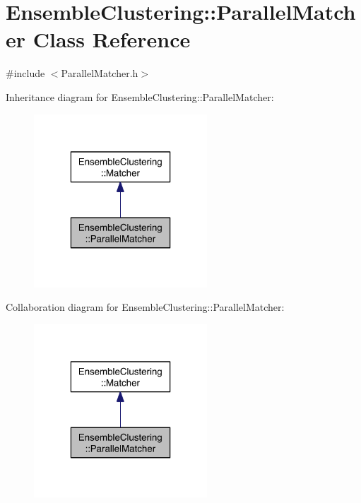 \hypertarget{class_ensemble_clustering_1_1_parallel_matcher}{\section{Ensemble\-Clustering\-:\-:Parallel\-Matcher Class Reference}
\label{class_ensemble_clustering_1_1_parallel_matcher}
}


{\ttfamily \#include $<$Parallel\-Matcher.\-h$>$}



Inheritance diagram for Ensemble\-Clustering\-:\-:Parallel\-Matcher\-:\nopagebreak
\begin{figure}[H]
\begin{center}
\leavevmode
\includegraphics[width=184pt]{class_ensemble_clustering_1_1_parallel_matcher__inherit__graph}
\end{center}
\end{figure}


Collaboration diagram for Ensemble\-Clustering\-:\-:Parallel\-Matcher\-:\nopagebreak
\begin{figure}[H]
\begin{center}
\leavevmode
\includegraphics[width=184pt]{class_ensemble_clustering_1_1_parallel_matcher__coll__graph}
\end{center}
\end{figure}
